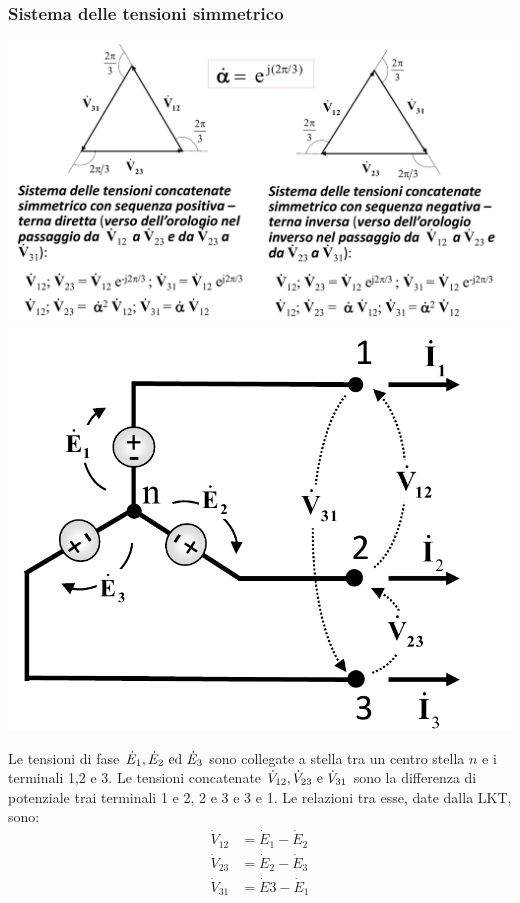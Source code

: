\documentclass{article}
\begin{document}
\subsubsection{Sistema delle tensioni simmetrico}
\begin{center}
    \includegraphics[scale=0.3]{Image/Sistema_delle_tensioni_simmetrico.png}
    \includegraphics[scale=0.3]{Image/Sistemi_trifase_2.png}
\end{center}
Le tensioni di fase $\dot E_1, \dot E_2 \text{ ed } \dot E_3$ sono collegate a stella tra un centro stella $n$ e i terminali 1,2 e 3. Le tensioni concatenate $\dot V_{12}, \dot V_{23} \text{ e } \dot V_{31}$ sono la differenza di potenziale trai terminali 1 e 2, 2 e 3 e 3 e 1. Le relazioni tra esse, date dalla LKT, sono:
\begin{align*}
    \dot V_{12} &= \dot E_1 - \dot E_2\\
    \dot V_{23} &= \dot E_2 - \dot E_3\\
    \dot V_{31} &= \dot E3 - \dot E_1
\end{align*} 
\end{document}

